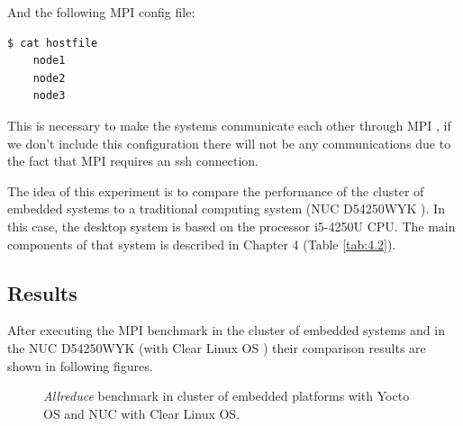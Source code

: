 And the following MPI config file:

\begin{minipage}{\textwidth}
\end{minipage}

\begin{minipage}{\textwidth}
\begin{lstlisting}[frame=single]
  $ cat hostfile
    node1
    node2
    node3
\end{lstlisting}

\end{minipage}

This is necessary to make the systems communicate each other through MPI , if
we don't include this configuration there will not be any communications due to
the fact that MPI requires an ssh connection. 

The idea of this experiment is to compare the performance of the cluster of
embedded systems to a traditional computing system (NUC D54250WYK \cite{NUC}).
In this case, the desktop system is based on the processor i5-4250U CPU. The
main components of that system is described in Chapter 4 (Table \ref{tab:4.2}).

\subsection{Results}

After executing the MPI benchmark in the cluster of embedded systems  and in
the NUC D54250WYK \cite{NUC} (with Clear Linux OS \cite{clear-linux}) their
comparison results are shown in following figures. 


\begin{figure}[H]
\begin{center}
\end{center}
\caption{\textit{Allreduce} benchmark in cluster of embedded platforms with Yocto OS and NUC
with Clear Linux OS.}
\label{all_reduce_cluster}
\end{figure}

